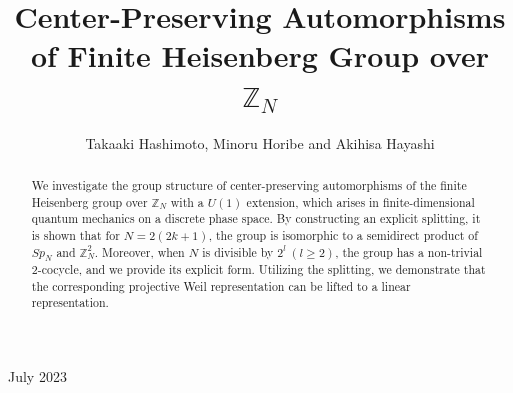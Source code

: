 \documentclass[12pt]{iopart}
\begin{document}

\title[
Center-Preserving Automorphisms of Finite Heisenberg Group over \(\mathbb Z_N\)
]{
Center-Preserving Automorphisms of Finite Heisenberg Group over \(\mathbb Z_N\)
}


\author{Takaaki Hashimoto, Minoru Horibe and Akihisa Hayashi}

\address{Department of Applied Physics, University of Fukui, Fukui Bunkyo 3-9-1, 910-8507, Japan}
\vspace{10pt}
\begin{indented}
\item[]July 2023
\end{indented}

\begin{abstract}
We investigate the group structure of center-preserving automorphisms of the finite Heisenberg group over
\(\mathbb Z_N\) with a \(U(1)\) extension, which arises in finite-dimensional quantum mechanics
on a discrete phase space.
By constructing an explicit splitting, it is shown that for \(N=2(2k+1)\),
the group is isomorphic to a semidirect product of \(Sp_N\) and \(\mathbb Z_N^2\).
Moreover, when \(N\) is divisible by \(2^l\ (l\ge2)\), the group has a non-trivial 2-cocycle,
and we provide its explicit form.
Utilizing the splitting, we demonstrate that the corresponding projective Weil representation
can be lifted to a linear representation.
\end{abstract}
\end{document}
